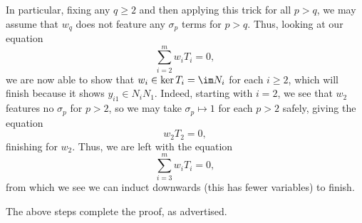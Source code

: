 \begin{enumerate}
	In particular, fixing any $q\ge2$ and then applying this trick for all $p>q$, we may assume that $w_q$ does not feature any $\sigma_p$ terms for $p>q$. Thus, looking at our equation
	\[\sum_{i=2}^mw_iT_i=0,\]
	we are now able to show that $w_i\in\ker T_i=\im N_i$ for each $i\ge2$, which will finish because it shows $y_{i1}\in N_iN_1$. Indeed, starting with $i=2$, we see that $w_2$ features no $\sigma_p$ for $p>2$, so we may take $\sigma_p\mapsto1$ for each $p>2$ safely, giving the equation
	\[w_2T_2=0,\]
	finishing for $w_2$. Thus, we are left with the equation
	\[\sum_{i=3}^mw_iT_i=0,\]
	from which we see we can induct downwards (this has fewer variables) to finish.
\end{enumerate}
The above steps complete the proof, as advertised.